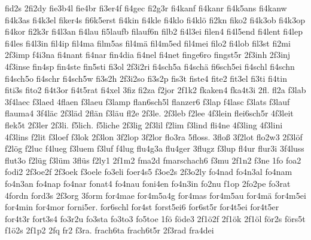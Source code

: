 {    fid2s
    2fi2dy
    fie3b4l
    fie4br
    fi3er4f
    fi4gec
    fi2g3r
    fi4kanf
    fi4kanr
    fi4k5ans
    fi4kanw
    fi4k3as
    fi4k3el
    fiker4s
    fi6k5erst
    fi4kin
    fi4kle
    fi4klo
    fi4klö
    fi2kn
    fiko2
    fi4k3ob
    fi4k3op
    fi4kor
    fi2k3r
    fi4l3an
    fi4lau
    fi5laufb
    filauf6n
    filb2
    fi4l3ei
    filen4
    fi4l5end
    fi4lent
    fi4lep
    fi4les
    fi4l3in
    fil4ip
    fil4ma
    film5as
    fil4mä
    fil4m5ed
    fil4mei
    filo2
    fi4lob
    fil3st
    fi2mi
    2f3imp
    f4i3na
    fi4nant
    fi4nar
    fin4dia
    fi4nel
    fi4net
    finge6ro
    fingst5r
    2f3inh
    2f3inj
    4f3inse
    fin4sp
    fin4ste
    fin5sti
    fi3ol
    2f3i2ri
    fi4sch5a
    fi4schä
    fi6sch5ei
    fi4schl
    fi4schn
    fi4sch5o
    fi4schr
    fi4sch5w
    fi3s2h
    2f3i2so
    fi3s2p
    fis3t
    fiste4
    fite2
    fit3el
    fi3ti
    fi4tin
    fiti3s
    fito2
    fi4t3or
    fi4t5rat
    fi4xel
    3fiz
    fi2za
    f2jor
    2f1k2
    fkaken4
    fka4t3i
    2fl.
    fl2a
    f3lab
    3f4laec
    f3laed
    4flaen
    f3laeu
    f3lamp
    flan6sch5l
    flanzer6
    f3lap
    f4lasc
    f3lats
    f3lauf
    flauma4
    3f4läc
    2f3läd
    2flän
    f3läu
    fl2e
    2f3le.
    2f3leb
    f2lee
    4f3lein
    flei6sch5r
    4f3leit
    flek5t
    2f3ler
    2f3li.
    f5lich.
    f5liche
    2f3lig
    2f3lil
    f2lim
    f3lind
    fli4ne
    4f3ling
    4f3lini
    4f3lins
    f2lit
    f3loef
    f3lok
    2f3lon
    3f2lop
    3f2lor
    flo3ra
    5floss.
    3floß
    3f2lot
    flo2w3
    2f3löf
    f2lög
    f2luc
    f4lueg
    f3luem
    f3luf
    f4lug
    flu4g3a
    flu4ger
    3flugz
    f3lup
    fl4ur
    flur3i
    3f4luss
    flut3o
    f2lüg
    f3lüm
    3flüs
    f2ly1
    2f1m2
    fma2d
    fmarschach6
    f3mu
    2f1n2
    f3ne
    1fo
    foa2
    fodi2
    2f3oe2f
    2f3oek
    f3oele
    fo3eli
    foer4s5
    f3oe2s
    2f3o2ly
    fo4nad
    fo4n3al
    fo4nam
    fo4n3an
    fo4nap
    fo4nar
    fonat4
    fo4nau
    foni4en
    fo4n3in
    fo2nu
    f1op
    2fo2pe
    fo3rat
    4fordn
    ford3s
    2f3org
    3form
    for4mae
    for4m5a4g
    for4mas
    for4m5au
    for4mä
    for4m5ei
    for4min
    for4mor
    forni5er.
    for6schl
    for4st
    forst5ei6
    for6st5r
    for4t5ei
    for4t5er
    for4t3r
    fort3s4
    fo3r2u
    fo3sta
    fo3to3
    fo5toe
    1fö
    föde3
    2f1ö2f
    2f1ök
    2f1öl
    för2s
    förs5t
    f1ö2s
    2f1p2
    2fq
    fr2
    f3ra.
    frach6ta
    frach6t5r
    2f3rad
    fra4dei
}
